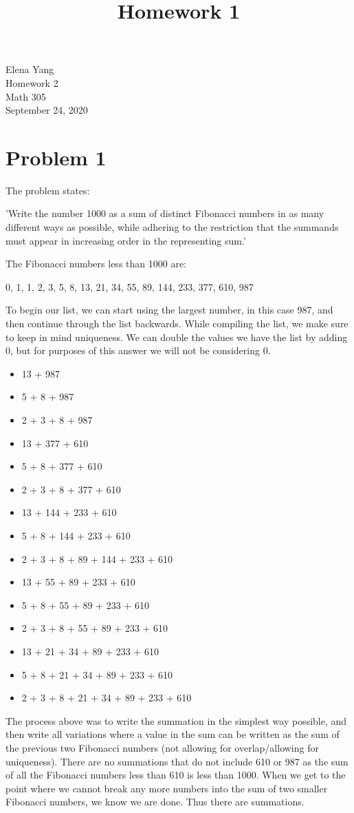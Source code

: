 \documentclass[12pt]{article}
\title{Homework 1}
\begin{document}
Elena Yang \\
Homework 2 \\
Math 305 \\
September 24, 2020

\hrulefill

\section{Problem 1}
The problem states:
\begin{center}
'Write the number 1000 as a sum of distinct Fibonacci numbers in as many different ways as possible, while adhering to the restriction that the summands must appear in increasing order in the representing sum.'
\end{center}
The Fibonacci numbers less than 1000 are:
\begin{center}
0, 1, 1, 2, 3, 5, 8, 13, 21, 34, 55, 89, 144, 233, 377, 610, 987
\end{center}
To begin our list, we can start using the largest number, in this case 987, and then continue through the list backwards. While compiling the list, we make sure to keep in mind uniqueness. We can double the values we have the list by adding 0, but for purposes of this answer we will not be considering 0.
\begin{itemize}
  \item 13 + 987
  \item 5 + 8 + 987
  \item 2 + 3 + 8 + 987
  \item 13 + 377 + 610
  \item 5 + 8 + 377 + 610
  \item 2 + 3 + 8 + 377 + 610
  \item 13 + 144 + 233 + 610
  \item 5 + 8 + 144 + 233 + 610
  \item 2 + 3 + 8 + 89 + 144 + 233 + 610
  \item 13 + 55 + 89 + 233 + 610
  \item 5 + 8 + 55 + 89 + 233 + 610
  \item 2 + 3 + 8 + 55 + 89 + 233 + 610
  \item 13 + 21 + 34 + 89 + 233 + 610
  \item 5 + 8 + 21 + 34 + 89 + 233 + 610
  \item 2 + 3 + 8 + 21 + 34 + 89 + 233 + 610
\end{itemize}
The process above was to write the summation in the simplest way possible, and then write all variations where a value in the sum can be written as the sum of the previous two Fibonacci numbers (not allowing for overlap/allowing for uniqueness). There are no summations that do not include 610 or 987 as the sum of all the Fibonacci numbers less than 610 is less than 1000. When we get to the point where we cannot break any more numbers into the sum of two smaller Fibonacci numbers, we know we are done. Thus there are  summations.
\end{document}
